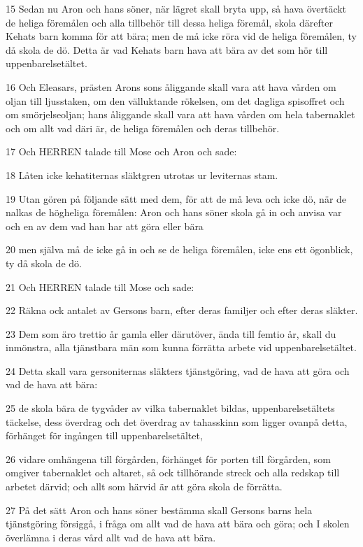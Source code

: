 \par 15 Sedan nu Aron och hans söner, när lägret skall bryta upp, så hava övertäckt de heliga föremålen och alla tillbehör till dessa heliga föremål, skola därefter Kehats barn komma för att bära; men de må icke röra vid de heliga föremålen, ty då skola de dö. Detta är vad Kehats barn hava att bära av det som hör till uppenbarelsetältet.
\par 16 Och Eleasars, prästen Arons sons åliggande skall vara att hava vården om oljan till ljusstaken, om den välluktande rökelsen, om det dagliga spisoffret och om smörjelseoljan; hans åliggande skall vara att hava vården om hela tabernaklet och om allt vad däri är, de heliga föremålen och deras tillbehör.
\par 17 Och HERREN talade till Mose och Aron och sade:
\par 18 Låten icke kehatiternas släktgren utrotas ur leviternas stam.
\par 19 Utan gören på följande sätt med dem, för att de må leva och icke dö, när de nalkas de högheliga föremålen: Aron och hans söner skola gå in och anvisa var och en av dem vad han har att göra eller bära
\par 20 men själva må de icke gå in och se de heliga föremålen, icke ens ett ögonblick, ty då skola de dö.
\par 21 Och HERREN talade till Mose och sade:
\par 22 Räkna ock antalet av Gersons barn, efter deras familjer och efter deras släkter.
\par 23 Dem som äro trettio år gamla eller därutöver, ända till femtio år, skall du inmönstra, alla tjänstbara män som kunna förrätta arbete vid uppenbarelsetältet.
\par 24 Detta skall vara gersoniternas släkters tjänstgöring, vad de hava att göra och vad de hava att bära:
\par 25 de skola bära de tygvåder av vilka tabernaklet bildas, uppenbarelsetältets täckelse, dess överdrag och det överdrag av tahasskinn som ligger ovanpå detta, förhänget för ingången till uppenbarelsetältet,
\par 26 vidare omhängena till förgården, förhänget för porten till förgården, som omgiver tabernaklet och altaret, så ock tillhörande streck och alla redskap till arbetet därvid; och allt som härvid är att göra skola de förrätta.
\par 27 På det sätt Aron och hans söner bestämma skall Gersons barns hela tjänstgöring försiggå, i fråga om allt vad de hava att bära och göra; och I skolen överlämna i deras vård allt vad de hava att bära.
